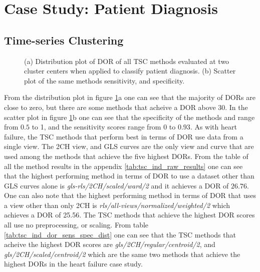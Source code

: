 \section{Case Study: Patient Diagnosis}

\subsection{Time-series Clustering}

\begin{figure}[H]
    \centering
    
    \caption{(a) Distribution plot of DOR of all TSC methods evaluated at two cluster centers when applied to classify patient diagnosis.
             (b) Scatter plot of the same methods sensitivity, and specificity.}
    \label{fig:tsc_ind_dor_sens_spec_dist}
\end{figure}

From the distribution plot in figure \ref{fig:tsc_ind_dor_sens_spec_dist}a one can see that the majority of DORs are close to zero, but there are some methods that acheive a DOR above 30.
In the scatter plot in figure \ref{fig:tsc_ind_dor_sens_spec_dist}b one can see that the specificity of the methods and range from $0.5$ to 1, 
and the sensitivity scores range from 0 to $0.93$. 
As with heart failure, the TSC methods that perform best in terms of DOR use data from a single view. 
The 2CH view, and GLS curves are the only view and curve that are used among the methods that achieve the five highest DORs.
From the table of all the method results in the appendix \ref{tab:tsc_ind_raw_results} one can see that the highest performing method in terms of DOR
to use a dataset other than GLS curves alone is \textit{gls-rls/2CH/scaled/ward/2} and it achieves a DOR of $26.76$.
One can also note that the highest performing method in terms of DOR that uses a view other than only 2CH is \textit{rls/all-views/normalized/weighted/2}
which achieves a DOR of 25.56.
The TSC methods that achieve the highest DOR scores all use no preprocessing, or scaling. 
From table \ref{tab:tsc_ind_dor_sens_spec_dist} one can see that the TSC methods that acheive the highest DOR scores are \textit{gls/2CH/regular/centroid/2}, 
and \textit{gls/2CH/scaled/centroid/2} which are the same two methods that achieve the highest DORs in the heart failure case study.

